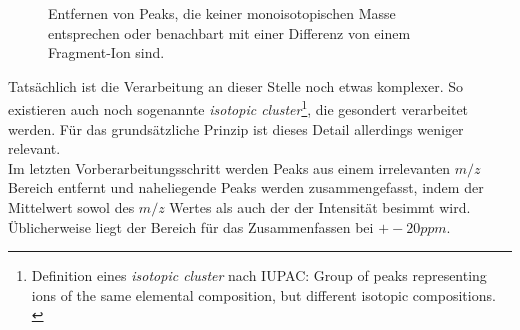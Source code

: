 \documentclass[a4paper, 12pt]{article}
\newcommand{\gerquot}[1]{\glqq#1\grqq}
\newcommand{\tikzScale}{1.0}
\newcommand{\massCharge}{$ m/z $ }
\begin{document}
\begin{figure}[H]
\begin{minipage}[t]{.45\linewidth}
      \end{minipage}
      \caption{Entfernen von Peaks, die keiner monoisotopischen Masse entsprechen oder benachbart mit einer Differenz von einem Fragment-Ion sind.}
      \label{fig:MonoisotopicMassFiltering}
\end{figure}

Tatsächlich ist die Verarbeitung an dieser Stelle noch etwas komplexer. So existieren auch noch sogenannte \emph{isotopic cluster}\footnote{Definition eines \emph{isotopic cluster} nach IUPAC: \gerquot{Group of peaks representing ions of the same elemental composition, but different isotopic compositions.} \cite[1556]{IUPACDefinitions}}, die gesondert verarbeitet werden. Für das grundsätzliche Prinzip ist dieses Detail allerdings weniger relevant.\\

Im letzten Vorberarbeitungsschritt werden Peaks aus einem irrelevanten \massCharge Bereich entfernt und naheliegende Peaks werden zusammengefasst, indem der Mittelwert sowol des \massCharge Wertes als auch der der Intensität besimmt wird. Üblicherweise liegt der Bereich für das Zusammenfassen bei $ +- 20 ppm $.
\end{document}

